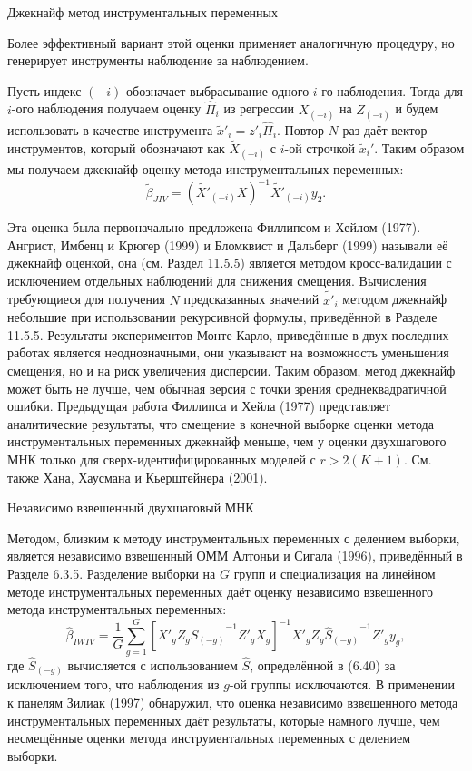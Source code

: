 \begin{center}
Джекнайф метод инструментальных переменных 
\end{center}

Более эффективный вариант этой оценки применяет аналогичную процедуру, но генерирует инструменты наблюдение за наблюдением.

Пусть индекс $(-i)$ обозначает выбрасывание одного $i$-го наблюдения. Тогда для $i$-ого наблюдения получаем оценку $\hat{\Pi}_i$ из регрессии $X_{(-i)}$ на $Z_{(-i)}$ и будем использовать в качестве инструмента $\tilde{x}'_i=z'_i \hat{\Pi}_i$. Повтор $N$ раз даёт вектор инструментов, который обозначают как $\tilde{X}_{(-i)}$ с $i$-ой строчкой $\tilde{x}_i'$. Таким образом мы получаем джекнайф оценку  метода инструментальных переменных:
\[
\tilde{\beta}_{JIV}=(\tilde{X'}_{(-i)}X)^{-1} \tilde{X'}_{(-i)} y_2.
\]

Эта оценка была первоначально предложена Филлипсом и Хейлом (1977). Ангрист, Имбенц и Крюгер (1999) и Бломквист и Дальберг (1999) называли её джекнайф оценкой, она (см. Раздел 11.5.5) является методом кросс-валидации с исключением отдельных наблюдений для снижения смещения. Вычисления требующиеся для получения $N$ предсказанных значений $\tilde{x'}_i$ методом джекнайф небольшие при использовании рекурсивной формулы, приведённой в Разделе 11.5.5. Результаты экспериментов Монте-Карло, приведённые в двух последних работах является неоднозначными, они указывают на возможность уменьшения смещения, но и на риск  увеличения дисперсии. Таким образом, метод джекнайф может быть не лучше, чем обычная версия с точки зрения среднеквадратичной ошибки. Предыдущая работа Филлипса и Хейла (1977) представляет аналитические результаты, что смещение в конечной выборке оценки метода инструментальных переменных джекнайф меньше, чем у оценки двухшагового МНК только для сверх-идентифицированных моделей с $r > 2(K+1)$. См. также Хана, Хаусмана и Кьерштейнера (2001).

\begin{center}
Независимо взвешенный двухшаговый МНК
\end{center}

Методом, близким к методу инструментальных переменных с делением выборки, является независимо взвешенный ОММ Алтоньи и Сигала (1996), приведённый в Разделе 6.3.5. Разделение выборки на $G$ групп и специализация на линейном методе инструментальных переменных даёт оценку независимо взвешенного метода инструментальных переменных:
\[
\hat{\beta}_{IWIV}=\frac{1}{G} \sum_{g=1}^{G} [X'_g Z_g {\hat{S}_{(-g)}}^{-1} Z'_g X_g]^{-1} X'_g Z_g {\hat{S}_{(-g)}}^{-1} Z'_g y_g,
\]
где $\hat{S}_{(-g)}$ вычисляется с использованием $\hat{S}$, определённой в (6.40) за исключением того, что наблюдения из $g$-ой группы исключаются. В применении к панелям Зилиак (1997) обнаружил, что оценка независимо взвешенного метода инструментальных переменных даёт результаты, которые намного лучше, чем несмещённые оценки метода инструментальных переменных с делением выборки.


